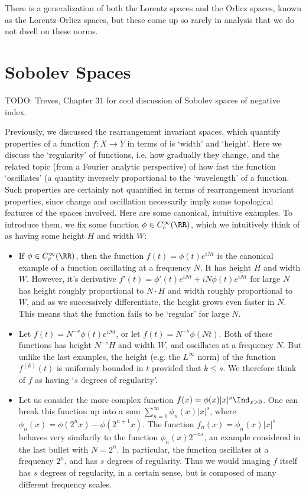 There is a generalization of both the Lorentz spaces and the Orlicz spaces, known as the Lorentz-Orlicz spaces, but these come up so rarely in analysis that we do not dwell on these norms.












\chapter{Sobolev Spaces}

TODO: Treves, Chapter 31 for cool discussion of Sobolev spaces of negative index.

Previously, we discussed the rearrangement invariant spaces, which quantify properties of a function $f: X \to Y$ in terms of is `width' and `height'. Here we discuss the `regularity' of functions, i.e. how gradually they change, and the related topic (from a Fourier analytic perspective) of how fast the function `oscillates' (a quantity inversely proportional to the `wavelength' of a function. Such properties are certainly not quantified in terms of rearrangement invariant properties, since change and oscillation necessarily imply some topological features of the spaces involved. Here are some canonical, intuitive examples. To introduce them, we fix some function $\phi \in C_c^\infty(\RR)$, which we intuitively think of as having some height $H$ and width $W$:
%
\begin{itemize}
    \item If $\phi \in C_c^\infty(\RR)$, then the function $f(t) = \phi(t) e^{iNt}$ is the canonical example of a function oscillating at a frequency $N$. It has height $H$ and width $W$. However, it's derivative $f'(t) = \phi'(t) e^{iNt} + iN \phi(t) e^{iNt}$ for large $N$ has height roughly proportional to $N \cdot H$ and width roughly proportional to $W$, and as we successively differentiate, the height grows even faster in $N$. This means that the function fails to be `regular' for large $N$.

    \item Let $f(t) = N^{-s} \phi(t) e^{iNt}$, or let $f(t) = N^{-s} \phi(Nt)$. Both of these functions has height $N^{-s} H$ and width $W$, and oscillates at a frequency $N$. But unlike the last examples, the height (e.g. the $L^\infty$ norm) of the function $f^{(k)}(t)$ is uniformly bounded in $t$ provided that $k \leq s$. We therefore think of $f$ as having `$s$ degrees of regularity'.

    \item Let us consider the more complex function $f(x) = \phi(x) |x|^s \Ind_{x > 0}$. One can break this function up into a sum $\sum_{n = 0}^\infty \phi_n(x) |x|^s$, where $\phi_n(x) = \phi(2^n x) - \phi(2^{n+1} x)$. The function $f_n(x) = \phi_n(x) |x|^s$ behaves very similarily to the function $\phi_n(x) 2^{-ns}$, an example considered in the last bullet with $N = 2^n$. In particular, the function oscillates at a frequency $2^n$, and has $s$ degrees of regularity. Thus we would imaging $f$ itself has $s$ degrees of regularity, in a certain sense, but is composed of many different frequency scales.
\end{itemize}
